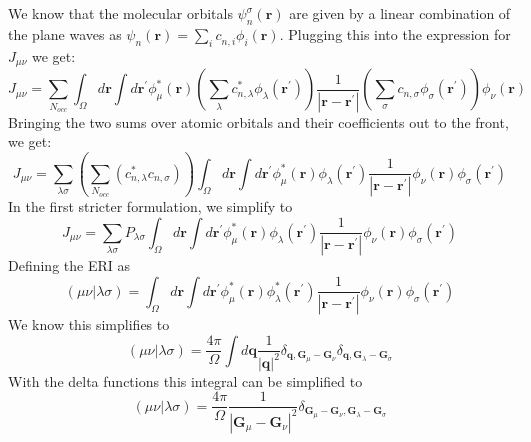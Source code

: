 \documentclass[12pt]{article}
\begin{document}
We know that the molecular orbitals $\psi_n^{\sigma }(\mathbf{r})$ are given by a linear combination of the plane waves as $\psi_n^{}(\mathbf{r}) = \sum_i c^{}_{n,i} \phi_i(\mathbf{r})$. Plugging this into the expression for $J_{\mu\nu}$ we get:
\begin{equation}
    J_{\mu\nu} = \sum_{N_{occ}} \int_{\Omega } d\mathbf{r} \int d\mathbf{r}^{\prime} \phi^*_\mu(\mathbf{r}) \left( \sum_{\lambda} c_{n,\lambda}^{*} \phi_\lambda(\mathbf{r}^{\prime}) \right) \frac{1}{\left|\mathbf{r} - \mathbf{r}^{\prime}\right|} \left( \sum_{\sigma } c_{n,\sigma } \phi_\sigma(\mathbf{r}^{\prime}) \right) \phi_\nu(\mathbf{r})
\end{equation}
Bringing the two sums over atomic orbitals and their coefficients out to the front, we get:
\begin{equation}
    J_{\mu\nu} = \sum_{\lambda\sigma} \left( \sum_{N_{occ}} \left( c_{n,\lambda}^{*} c_{n,\sigma } \right) \right) \int_{\Omega } d\mathbf{r} \int d\mathbf{r}^{\prime} \phi^*_\mu(\mathbf{r}) \phi_\lambda(\mathbf{r}^{\prime}) \frac{1}{\left|\mathbf{r} - \mathbf{r}^{\prime}\right|} \phi_\nu(\mathbf{r}) \phi_\sigma (\mathbf{r}^{\prime})
\end{equation}
In the first stricter formulation, we simplify to
\begin{equation}
    J_{\mu\nu} = \sum_{\lambda\sigma} P_{\lambda\sigma } \int_{\Omega } d\mathbf{r} \int d\mathbf{r}^{\prime} \phi^*_\mu(\mathbf{r}) \phi_\lambda(\mathbf{r}^{\prime}) \frac{1}{\left|\mathbf{r} - \mathbf{r}^{\prime}\right|} \phi_\nu(\mathbf{r}) \phi_\sigma (\mathbf{r}^{\prime})
\end{equation}
Defining the ERI as
\begin{equation}
    (\mu\nu|\lambda\sigma) = \int_{\Omega } d\mathbf{r} \int d\mathbf{r}^{\prime} \phi^*_\mu(\mathbf{r}) \phi^*_{\lambda }(\mathbf{r}^{\prime}) \frac{1}{\left|\mathbf{r} - \mathbf{r}^{\prime}\right|} \phi_{\nu}(\mathbf{r}) \phi_\sigma (\mathbf{r}^{\prime})
\end{equation}
We know this simplifies to
\begin{equation}
    (\mu\nu|\lambda \sigma) = \frac{4\pi}{\Omega} \int d\mathbf{q} \frac{1}{|\mathbf{q}|^2} \delta_{\mathbf{q}, \mathbf{G}_\mu - \mathbf{G}_\nu} \delta_{\mathbf{q}, \mathbf{G}_\lambda - \mathbf{G}_\sigma}
\end{equation}
With the delta functions this integral can be simplified to
\begin{equation}
    (\mu\nu|\lambda \sigma) = \frac{4\pi}{\Omega} \frac{1}{|\mathbf{G}_\mu - \mathbf{G}_\nu|^2} \delta_{\mathbf{G}_\mu - \mathbf{G}_\nu, \mathbf{G}_\lambda - \mathbf{G}_\sigma}
\end{equation}
\end{document}
